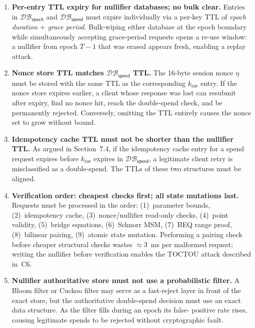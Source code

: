 \documentclass[11pt]{article}
\theoremstyle{definitionstyle}
\theoremstyle{plain}
\newcommand{\DB}{\mathcal{DB}}
\begin{document}
\begin{enumerate}[leftmargin=*,label=\textbf{M\arabic*.}]

\item \textbf{Per-entry TTL expiry for nullifier databases; no bulk clear.}
  Entries in $\DB_{\mathsf{epoch}}$ and $\DB_{\mathsf{spend}}$ must expire
  individually via a per-key TTL of \emph{epoch duration $+$ grace period}.
  Bulk-wiping either database at the epoch boundary while simultaneously
  accepting grace-period requests opens a re-use window: a nullifier from
  epoch $T-1$ that was erased appears fresh, enabling a replay attack.

\item \textbf{Nonce store TTL matches $\DB_{\mathsf{spend}}$ TTL.}
  The 16-byte session nonce $\eta$ must be stored with the same TTL as the
  corresponding $k_{\mathsf{cur}}$ entry.  If the nonce store expires earlier,
  a client whose response was lost can resubmit after expiry, find no nonce
  hit, reach the double-spend check, and be permanently rejected.  Conversely,
  omitting the TTL entirely causes the nonce set to grow without bound.

\item \textbf{Idempotency cache TTL must not be shorter than the nullifier TTL.}
  As argued in Section~7.4, if the idempotency cache entry for a spend
  request expires before $k_{\mathsf{cur}}$ expires in $\DB_{\mathsf{spend}}$,
  a legitimate client retry is misclassified as a double-spend.  The TTLs of
  these two structures must be aligned.

\item \textbf{Verification order: cheapest checks first; all state mutations last.}
  Requests must be processed in the order: (1)~parameter bounds,
  (2)~idempotency cache, (3)~nonce/nullifier read-only checks, (4)~point
  validity, (5)~bridge equations, (6)~Schnorr MSM, (7)~BEQ range proof,
  (8)~bilinear pairing, (9)~atomic state mutation.  Performing a pairing
  check before cheaper structural checks wastes $\approx 3$~ms per
  malformed request; writing the nullifier before verification enables the
  TOCTOU attack described in~C6.

\item \textbf{Nullifier authoritative store must not use a probabilistic filter.}
  A Bloom filter or Cuckoo filter may serve as a fast-reject layer in front
  of the exact store, but the authoritative double-spend decision must use
  an exact data structure.  As the filter fills during an epoch its false-
  positive rate rises, causing legitimate spends to be rejected without
  cryptographic fault.


\end{enumerate}
\end{document}
